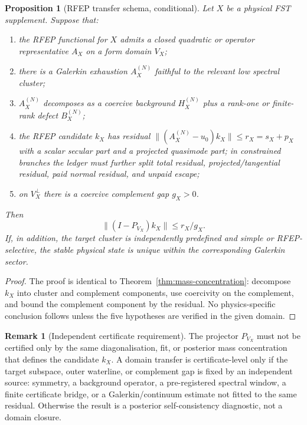 \documentclass[11pt,a4paper]{article}
\theoremstyle{plain}
\newtheorem{proposition}[theorem]{Proposition}
\theoremstyle{definition}
\newtheorem{remark}[theorem]{Remark}
\begin{document}
\begin{proposition}[RFEP transfer schema, conditional]
\label{prop:rfep-transfer-schema}
Let $X$ be a physical FST supplement.  Suppose that:
\begin{enumerate}[leftmargin=*]
\item the RFEP functional for $X$ admits a closed quadratic or
  operator representative $A_X$ on a form domain $V_X$;
\item there is a Galerkin exhaustion $A_X^{(N)}$ faithful to the
  relevant low spectral cluster;
\item $A_X^{(N)}$ decomposes as a coercive background
  $H_X^{(N)}$ plus a rank-one or finite-rank defect $B_X^{(N)}$;
\item the RFEP candidate $k_X$ has residual
  $\|(A_X^{(N)}-u_0)k_X\|\le r_X=s_X+p_X$ with a scalar secular
  part and a projected quasimode part; in constrained branches the
  ledger must further split total residual, projected/tangential
  residual, paid normal residual, and unpaid escape;
\item on $V_X^\perp$ there is a coercive complement gap $g_X>0$.
\end{enumerate}
Then
\[
  \|(I-P_{V_X})k_X\|\le r_X/g_X.
\]
If, in addition, the target cluster is independently predefined and
simple or RFEP-selective, the stable physical state is unique within
the corresponding Galerkin sector.
\end{proposition}

\begin{proof}
The proof is identical to Theorem~\ref{thm:mass-concentration}:
decompose $k_X$ into cluster and complement components, use
coercivity on the complement, and bound the complement component by
the residual.  No physics-specific conclusion follows unless the
five hypotheses are verified in the given domain.
\end{proof}

\begin{remark}[Independent certificate requirement]
\label{rem:independent-certificate}
The projector $P_{V_X}$ must not be certified only by the same
diagonalisation, fit, or posterior mass concentration that defines the
candidate $k_X$.  A domain transfer is certificate-level only if the
target subspace, outer waterline, or complement gap is fixed by an
independent source: symmetry, a background operator, a pre-registered
spectral window, a finite certificate bridge, or a Galerkin/continuum
estimate not fitted to the same residual.  Otherwise the result is a
posterior self-consistency diagnostic, not a domain closure.
\end{remark}
\end{document}
